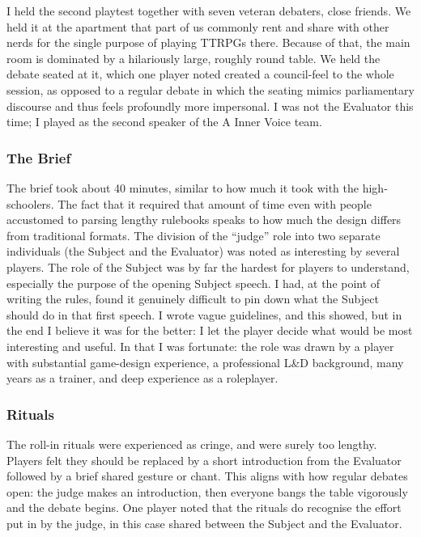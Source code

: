 \documentclass[12pt]{article}
\begin{document}
I held the second playtest together with seven veteran debaters, close friends. We held it at the apartment that part of us commonly rent and share with other nerds for the single purpose of playing TTRPGs there. Because of that, the main room is dominated by a hilariously large, roughly round table. We held the debate seated at it, which one player noted created a council-feel to the whole session, as opposed to a regular debate in which the seating mimics parliamentary discourse and thus feels profoundly more impersonal. I was not the Evaluator this time; I played as the second speaker of the A Inner Voice team.

\subsubsection{The Brief}

The brief took about 40 minutes, similar to how much it took with the high-schoolers. The fact that it required that amount of time even with people accustomed to parsing lengthy rulebooks speaks to how much the design differs from traditional formats. The division of the ``judge'' role into two separate individuals (the Subject and the Evaluator) was noted as interesting by several players. The role of the Subject was by far the hardest for players to understand, especially the purpose of the opening Subject speech. I had, at the point of writing the rules, found it genuinely difficult to pin down what the Subject should do in that first speech. I wrote vague guidelines, and this showed, but in the end I believe it was for the better: I let the player decide what would be most interesting and useful. In that I was fortunate: the role was drawn by a player with substantial game-design experience, a professional L\&D background, many years as a trainer, and deep experience as a roleplayer.

\subsubsection{Rituals}

The roll-in rituals were experienced as cringe, and were surely too lengthy. Players felt they should be replaced by a short introduction from the Evaluator followed by a brief shared gesture or chant. This aligns with how regular debates open: the judge makes an introduction, then everyone bangs the table vigorously and the debate begins. One player noted that the rituals do recognise the effort put in by the judge, in this case shared between the Subject and the Evaluator.
\end{document}
